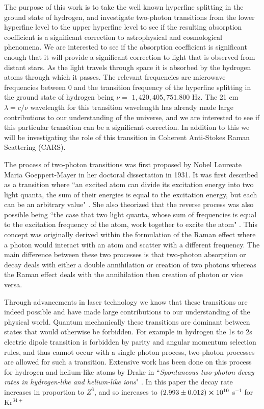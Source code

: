 The purpose of this work is to take the well known hyperfine splitting in the ground state of hydrogen, and investigate two-photon transitions from the lower hyperfine level to the upper hyperfine level to see if the resulting absorption coefficient is a significant correction to astrophysical and cosmological phenomena. We are interested to see if the absorption coefficient is significant enough that it will provide a significant correction to light that is observed from distant stars. As the light travels through space it is absorbed by the hydrogen atoms through which it passes. The relevant frequencies are microwave frequencies between 0 and the transition frequency of the hyperfine splitting in the ground state of hydrogen being $\nu =$ $1,420,405,751.800$ Hz. The 21 cm $\lambda=c/\nu$ wavelength for this transition wavelength has already made large contributions to our understanding of the universe, and we are interested to see if this particular transition can be a significant correction. In addition to this we will be investigating the role of this transition in Coherent Anti-Stokes Raman Scattering (CARS). 

The process of two-photon transitions was first proposed by Nobel Laureate Maria Goeppert-Mayer in her doctoral dissertation in 1931. It was first described as a transition where ``an excited atom can divide its excitation energy into two light quanta, the sum of their energies is equal to the excitation energy, but each can be an arbitrary value" \cite{maria}. She also theorized that the reverse process was also possible being ``the case that two light quanta, whose sum of frequencies is equal to the excitation frequency of the atom, work together to excite the atom" \cite{maria}. This concept was originally derived within the formulation of the Raman effect where a photon would interact with an atom and scatter with a different frequency. The main difference between these two processes is that two-photon absorption or decay deals with either a double annihilation or creation of two photons whereas the Raman effect deals with the annihilation then creation of photon or vice versa. 

Through advancements in laser technology we know that these transitions are indeed possible and have made large contributions to our understanding of the physical world. Quantum mechanically these transitions are dominant between states that would otherwise be forbidden. For example in hydrogen the 1s to 2s electric dipole transition is forbidden by parity and angular momentum selection rules, and thus cannot occur with a single photon process, two-photon processes are allowed for such a transition. Extensive work has been done on this process for hydrogen and helium-like atoms by Drake in ``\textit{Spontaneous two-photon decay rates in hydrogen-like and helium-like ions}" \cite{draketwopA}. In this paper the decay rate increases in proportion to $Z^6$, and so increases to \((2.993\pm 0.012) \cross 10^{10}\) s$^{-1}$ for Kr$^{34+}$

